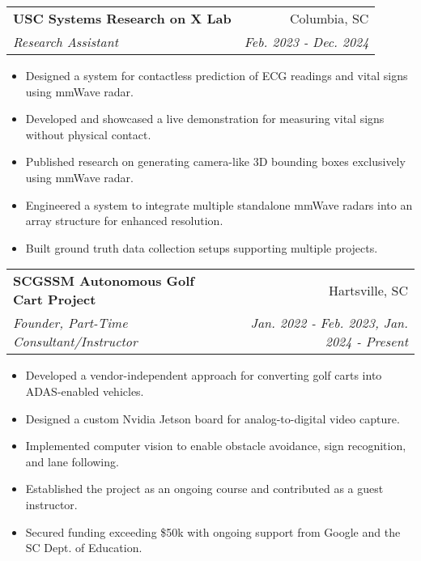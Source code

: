 \documentclass[letterpaper,12pt]{article}
\makeatletter
\newcommand{\resumeItem}[2]{
  \item\small{
    \textbf{#1}{: #2 \vspace{-2pt}}
  }
}
\newcommand{\resumeItemLine}[1]{
  \item\small{
    {#1 \vspace{-3pt}}
  }
}
\newcommand{\resumeSubheading}[4]{
  \vspace{-3pt}\item
    \begin{tabular*}{0.97\textwidth}{l@{\extracolsep{\fill}}r}
      \textbf{#1} & #2 \\
      \textit{\small#3} & \textit{\small #4} \\
    \end{tabular*}\vspace{-7pt}
}
\newcommand{\resumeItemListStart}{\begin{itemize}}
\newcommand{\resumeItemListEnd}{\end{itemize}\vspace{-5pt}}
\makeatother
\begin{document}
    \resumeSubheading
      {USC Systems Research on X Lab}{Columbia, SC}
      {Research Assistant}{Feb. 2023 - Dec. 2024}
      \resumeItemListStart
        \resumeItemLine{Designed a system for contactless prediction of ECG readings and vital signs using mmWave radar.}
        \resumeItemLine{Developed and showcased a live demonstration for measuring vital signs without physical contact.}
        \resumeItemLine{Published research on generating camera-like 3D bounding boxes exclusively using mmWave radar.}
        \resumeItemLine{Engineered a system to integrate multiple standalone mmWave radars into an array structure for enhanced resolution.}
        \resumeItemLine{Built ground truth data collection setups supporting multiple projects.}
      \resumeItemListEnd


    \resumeSubheading
      {SCGSSM Autonomous Golf Cart Project}{Hartsville, SC}
      {Founder, Part-Time Consultant/Instructor}{Jan. 2022 - Feb. 2023, Jan. 2024 - Present}
      \resumeItemListStart
        \resumeItemLine{Developed a vendor-independent approach for converting golf carts into ADAS-enabled vehicles.}
        \resumeItemLine{Designed a custom Nvidia Jetson board for analog-to-digital video capture.}
        \resumeItemLine{Implemented computer vision to enable obstacle avoidance, sign recognition, and lane following.}
        \resumeItemLine{Established the project as an ongoing course and contributed as a guest instructor.}
        \resumeItemLine{Secured funding exceeding \$50k with ongoing support from Google and the SC Dept. of Education.}
      \resumeItemListEnd
\end{document}
